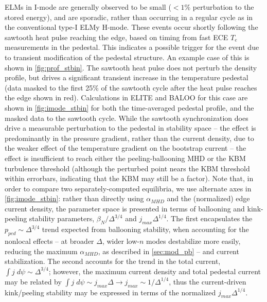 ELMs in I-mode are generally observed to be small ($<1\%$ perturbation to the stored energy), and are sporadic, rather than occurring in a regular cycle as in the conventional type-I ELMy H-mode.  These events occur shortly following the sawtooth heat pulse reaching the edge, based on timing from fast ECE $T_e$ measurements in the pedestal.  This indicates a possible trigger for the event due to transient modification of the pedestal structure.  An example case of this is shown in \cref{fig:prof_stbin}.  The sawtooth heat pulse does not perturb the density profile, but drives a significant transient increase in the temperature pedestal (data masked to the first 25\% of the sawtooth cycle after the heat pulse reaches the edge shown in red).  Calculations in ELITE and BALOO for this case are shown in \cref{fig:imode_stbin} for both the time-averaged pedestal profile, and the masked data to the sawtooth cycle.  While the sawtooth synchronization does drive a measurable perturbation to the pedestal in stability space -- the effect is predominantly in the pressure gradient, rather than the current density, due to the weaker effect of the temperature gradient on the bootstrap current -- the effect is insufficient to reach either the peeling-ballooning MHD or the KBM turbulence threshold (although the perturbed point nears the KBM threshold within errorbars, indicating that the KBM may still be a factor).  Note that, in order to compare two separately-computed equilibria, we use alternate axes in \cref{fig:imode_stbin}: rather than directly using $\alpha_{MHD}$ and the (normalized) edge current density, the parameter space is presented in terms of ballooning and kink-peeling stability parameters, $\beta_N/\Delta^{3/4}$ and $j_{max} \Delta^{1/4}$.  The first encapsulates the $p_{ped} \sim \Delta^{3/4}$ trend expected from ballooning stability, when accounting for the nonlocal effects -- at broader $\Delta$, wider low-$n$ modes destabilize more easily, reducing the maximum $\alpha_{MHD}$, as described in \cref{sec:mod_pb} -- and current stabilization.  The second accounts for the trend in the total current, $\int j \;d\psi \sim \Delta^{3/4}$; however, the maximum current density and total pedestal current may be related by $\int j \; d\psi \sim j_{max} \Delta \rightarrow j_{max} \sim 1/\Delta^{1/4}$, thus the current-driven kink/peeling stability may be expressed in terms of the normalized $j_{max} \Delta^{1/4}$.

